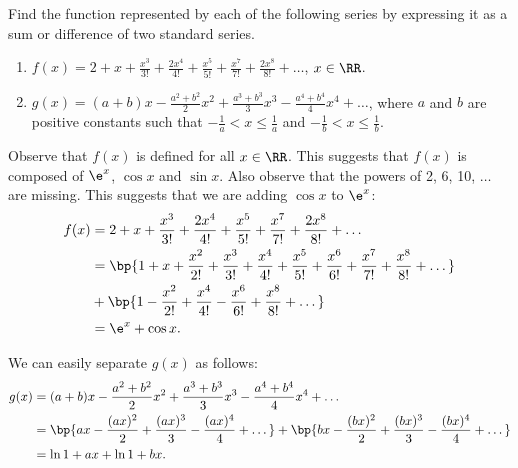 \clearpage
\begin{problem}[\chili]
    Find the function represented by each of the following series by expressing it as a sum or difference of two standard series.
    \begin{enumerate}
        \item $f(x) = 2+x+\frac{x^{3}}{3!}+\frac{2x^{4}}{4!}+\frac{x^{5}}{5!}+\frac{x^{7}}{7!}+\frac{2x^{8}}{8!}+\dots$, $x\in\RR$.
        \item $g(x)= (a+b)x-\frac{a^{2}+b^{2}}{2}x^{2}+\frac{a^{3}+b^{3}}{3}x^3 - \frac{a^4 + b^4}4 x^4 + \dots$, where $a$ and $b$ are positive constants such that $-\frac1a < x \leq \frac1a$ and $-\frac1b < x \leq \frac1b$.
    \end{enumerate}
\end{problem}
\begin{solution}
    \begin{ppart}
        Observe that $f(x)$ is defined for all $x \in \RR$. This suggests that $f(x)$ is composed of $\e^x$, $\cos x$ and $\sin x$. Also observe that the powers of 2, 6, 10, $\dots$ are missing. This suggests that we are adding $\cos x$ to $\e^x$:
        \begin{align*}
            f(x) &= 2+x+\frac{x^{3}}{3!}+\frac{2x^{4}}{4!}+\frac{x^{5}}{5!}+\frac{x^{7}}{7!}+\frac{2x^{8}}{8!}+\dots\\
            &= \bp{1 + x + \frac{x^2}{2!} + \frac{x^3}{3!} + \frac{x^4}{4!} + \frac{x^5}{5!} + \frac{x^6}{6!} + \frac{x^7}{7!} + \frac{x^8}{8!} + \dots}\\
            &+ \bp{1 - \frac{x^2}{2!} + \frac{x^4}{4!} - \frac{x^6}{6!} + \frac{x^8}{8!} + \dots}\\
            &=\e^x + \cos x.
        \end{align*}
    \end{ppart}
    \begin{ppart}
        We can easily separate $g(x)$ as follows:
        \begin{align*}
            g(x) &= (a+b)x-\frac{a^{2}+b^{2}}{2}x^{2}+\frac{a^{3}+b^{3}}{3}x^3 - \frac{a^4 + b^4}4 x^4 + \dots\\
            &= \bp{ax - \frac{(ax)^2}{2} + \frac{(ax)^3}{3} - \frac{(ax)^4}{4} + \dots} + \bp{bx - \frac{(bx)^2}{2} + \frac{(bx)^3}{3} - \frac{(bx)^4}{4} + \dots}\\
            &= \ln{1 + ax} + \ln{1 + bx}.
        \end{align*}
    \end{ppart}
\end{solution}